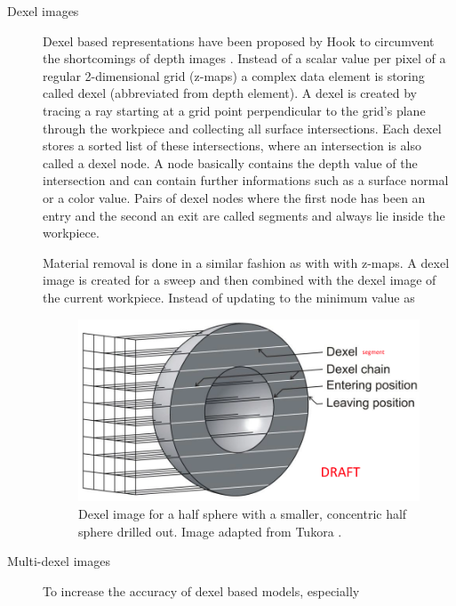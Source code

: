 \begin{description}
	\item[Dexel images]
	Dexel based representations have been proposed by Hook to circumvent the shortcomings of depth images \cite{dexel}.
	Instead of a scalar value per pixel of a regular 2-dimensional grid (z-maps) a complex data element is storing called dexel (abbreviated from depth element).
	A dexel is created by tracing a ray starting at a grid point perpendicular to the grid's plane through the workpiece and collecting all surface intersections.
	Each dexel stores a sorted list of these intersections, where an intersection is also called a dexel node.
	A node basically contains the depth value of the intersection and can contain further informations such as a surface normal or a color value.
	Pairs of dexel nodes where the first node has been an entry and the second an exit are called segments and always lie inside the workpiece.
	
	Material removal is done in a similar fashion as with with z-maps.
	A dexel image is created for a sweep and then combined with the dexel image of the current workpiece.
	Instead of updating to the minimum value as 
		
	\begin{figure}[h]
		\centering
		\includegraphics[width=\textwidth]{images/dexels}
		\caption{
			Dexel image for a half sphere with a smaller, concentric half sphere drilled out.
			Image adapted from Tukora \cite{virtual_machining_review}.
		}
		\label{fig:dexel_image}
	\end{figure}
		
	\item[Multi-dexel images]
	To increase the accuracy of dexel based models, especially 


\end{description}
